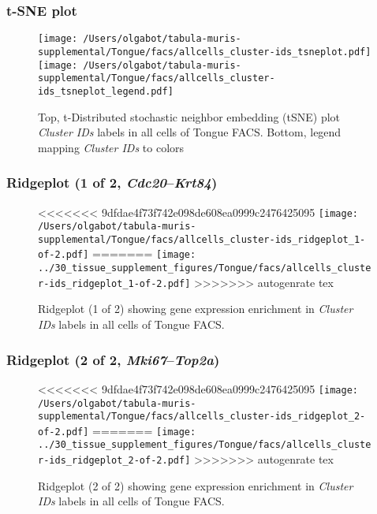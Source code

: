 \clearpage
\subsubsection{t-SNE plot}
\begin{figure}[h]
\centering
\texttt{[image: /Users/olgabot/tabula-muris-supplemental/Tongue/facs/allcells\_cluster-ids\_tsneplot.pdf]}
\texttt{[image: /Users/olgabot/tabula-muris-supplemental/Tongue/facs/allcells\_cluster-ids\_tsneplot\_legend.pdf]}
\caption{Top, t-Distributed stochastic neighbor embedding (tSNE) plot  \emph{Cluster IDs} labels in all cells of Tongue FACS. Bottom, legend mapping \emph{Cluster IDs} to colors}
\end{figure}


\clearpage

\subsubsection{Ridgeplot (1 of 2, \emph{Cdc20}--\emph{Krt84})}
\begin{figure}[h]
\centering
<<<<<<< 9dfdae4f73f742e098de608ea0999c2476425095
\texttt{[image: /Users/olgabot/tabula-muris-supplemental/Tongue/facs/allcells\_cluster-ids\_ridgeplot\_1-of-2.pdf]}
=======
\texttt{[image: ../30\_tissue\_supplement\_figures/Tongue/facs/allcells\_cluster-ids\_ridgeplot\_1-of-2.pdf]}
>>>>>>> autogenrate tex

\caption{ Ridgeplot (1 of 2)  showing gene expression enrichment in \emph{Cluster IDs} labels in all cells of Tongue FACS. }
\end{figure}


\clearpage

\subsubsection{Ridgeplot (2 of 2, \emph{Mki67}--\emph{Top2a})}
\begin{figure}[h]
\centering
<<<<<<< 9dfdae4f73f742e098de608ea0999c2476425095
\texttt{[image: /Users/olgabot/tabula-muris-supplemental/Tongue/facs/allcells\_cluster-ids\_ridgeplot\_2-of-2.pdf]}
=======
\texttt{[image: ../30\_tissue\_supplement\_figures/Tongue/facs/allcells\_cluster-ids\_ridgeplot\_2-of-2.pdf]}
>>>>>>> autogenrate tex

\caption{ Ridgeplot (2 of 2)  showing gene expression enrichment in \emph{Cluster IDs} labels in all cells of Tongue FACS. }
\end{figure}


